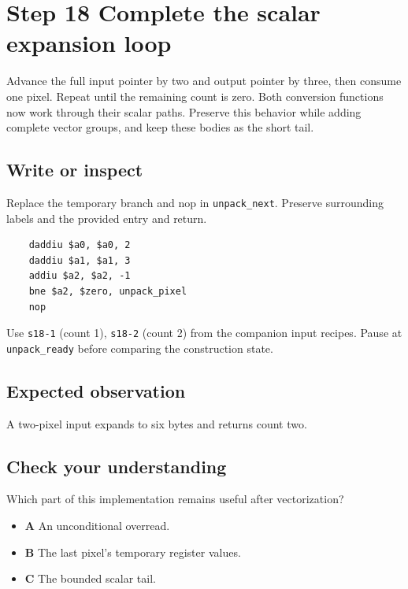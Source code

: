 \section{Step 18 Complete the scalar expansion loop}\label{rgb-s18}

Advance the full input pointer by two and output pointer by three, then consume one pixel. Repeat until the remaining count is zero. Both conversion functions now work through their scalar paths. Preserve this behavior while adding complete vector groups, and keep these bodies as the short tail.

\subsection{Write or inspect}
Replace the temporary branch and nop in \texttt{unpack\_next}. Preserve surrounding labels and the provided entry and return.

\begin{verbatim}
    daddiu $a0, $a0, 2
    daddiu $a1, $a1, 3
    addiu $a2, $a2, -1
    bne $a2, $zero, unpack_pixel
    nop
\end{verbatim}
Use \texttt{s18-1} (count 1), \texttt{s18-2} (count 2) from the companion input recipes. Pause at \texttt{unpack\_ready} before comparing the construction state.

\subsection{Expected observation}
A two-pixel input expands to six bytes and returns count two.

\subsection{Check your understanding}
Which part of this implementation remains useful after vectorization?

\begin{itemize}
  \item \textbf{A} An unconditional overread.
  \item \textbf{B} The last pixel's temporary register values.
  \item \textbf{C} The bounded scalar tail.
\end{itemize}
